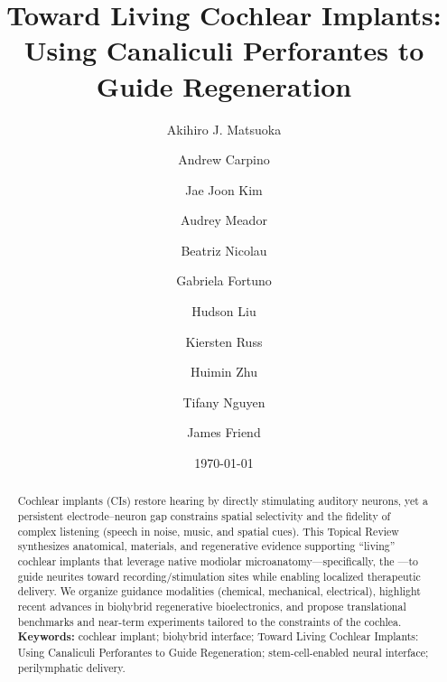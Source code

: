 \documentclass[
preprint,
aps,
pra,
floatfix
]{revtex4-2}
\begin{document}
\preprint{}  %

\title{Toward Living Cochlear Implants: Using Canaliculi Perforantes to Guide Regeneration}

\author{Akihiro J. Matsuoka}
\author{Andrew Carpino}
\author{Jae Joon Kim}
\author{Audrey Meador}
\author{Beatriz Nicolau}
\author{Gabriela Fortuno}
\author{Hudson Liu}
\author{Kiersten Russ}
\author{Huimin Zhu}
\author{Tifany Nguyen}
\author{James Friend}

\date{\today}
\begin{abstract}
\noindent
Cochlear implants (CIs) restore hearing by directly stimulating auditory neurons, yet a persistent electrode--neuron gap constrains spatial selectivity and the fidelity of complex listening (speech in noise, music, and spatial cues). This Topical Review synthesizes anatomical, materials, and regenerative evidence supporting ``living'' cochlear implants that leverage native modiolar microanatomy---specifically, the \CPS---to guide neurites toward recording/stimulation sites while enabling localized therapeutic delivery. We organize guidance modalities (chemical, mechanical, electrical), highlight recent advances in biohybrid regenerative bioelectronics, and propose translational benchmarks and near-term experiments tailored to the constraints of the cochlea.
\\[3pt]
\textbf{Keywords:} cochlear implant; biohybrid interface; Toward Living Cochlear Implants: Using Canaliculi Perforantes to Guide Regeneration; stem-cell-enabled neural interface; perilymphatic delivery.
\end{abstract}
\maketitle









\end{document}
